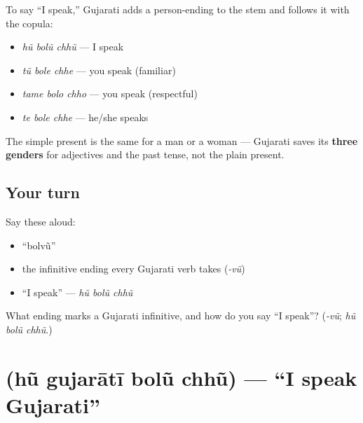 \begin{grammarlens}[title={Grammar Lens: stem + person + copula}]
To say \textquotedblleft{}I speak,\textquotedblright{} Gujarati adds a person-ending to the stem and follows it with the copula:

\begin{itemize}
\raggedright
  \item \emph{hũ bolũ chhũ} — I speak
  \item \emph{tũ bole chhe} — you speak (familiar)
  \item \emph{tame bolo chho} — you speak (respectful)
  \item \emph{te bole chhe} — he/she speaks
\end{itemize}

The simple present is the same for a man or a woman — Gujarati saves its \textbf{three genders} for adjectives and the past tense, not the plain present.
\end{grammarlens}

\subsection*{Your turn}
Say these aloud:

\begin{itemize}
\raggedright
  \item \textquotedblleft{}bolvũ\textquotedblright{}
  \item the infinitive ending every Gujarati verb takes (\emph{-vũ})
  \item \textquotedblleft{}I speak\textquotedblright{} — \emph{hũ bolũ chhũ}
\end{itemize}

\begin{tcolorbox}[breakable,colback=teal!4,colframe=teal!35!black,title={Before you move on}]
What ending marks a Gujarati infinitive, and how do you say \textquotedblleft{}I speak\textquotedblright{}? (\emph{-vũ}; \emph{hũ bolũ chhũ}.)
\end{tcolorbox}
\section[\texorpdfstring{\gu{હું} \gu{ગુજરાતી} \gu{બોલું} \gu{છું} (hũ gujarātī bolũ chhũ)}{હું ગુજરાતી બોલું છું (hũ gujarātī bolũ chhũ)}]{    (hũ gujarātī bolũ chhũ) — \textquotedblleft{}I speak Gujarati\textquotedblright{}}

\label{lesson:GU-C05-hun-gujarati-bolun-chhun}



